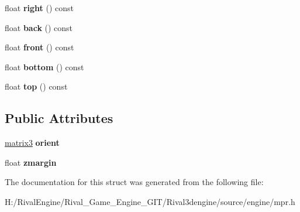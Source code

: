 \begin{DoxyCompactItemize}
float {\bfseries right} () const
\item 
\mbox{\label{structmpr_1_1_ent_o_b_b_a92d949210b611322d123eefa79374d06}} 
float {\bfseries back} () const
\item 
\mbox{\label{structmpr_1_1_ent_o_b_b_a7b135a593d7f443cfb5b77731a9d276e}} 
float {\bfseries front} () const
\item 
\mbox{\label{structmpr_1_1_ent_o_b_b_adb4723b4da461924e9d1c9f0c92046b8}} 
float {\bfseries bottom} () const
\item 
\mbox{\label{structmpr_1_1_ent_o_b_b_ad55d7e8d7082890fa0e75cbbe5692464}} 
float {\bfseries top} () const
\end{DoxyCompactItemize}
\subsection*{Public Attributes}
\begin{DoxyCompactItemize}
\item 
\mbox{\label{structmpr_1_1_ent_o_b_b_aa1bbdce563c10adcbc1baedf2c91ea31}} 
\hyperlink{structmatrix3}{matrix3} {\bfseries orient}
\item 
\mbox{\label{structmpr_1_1_ent_o_b_b_aa8ef9994738587f90de7ceaf0a09561a}} 
float {\bfseries zmargin}
\end{DoxyCompactItemize}


The documentation for this struct was generated from the following file\+:\begin{DoxyCompactItemize}
\item 
H\+:/\+Rival\+Engine/\+Rival\+\_\+\+Game\+\_\+\+Engine\+\_\+\+G\+I\+T/\+Rival3dengine/source/engine/mpr.\+h\end{DoxyCompactItemize}
